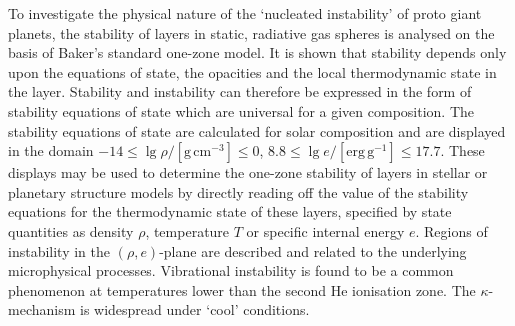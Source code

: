  
  \abstract
   {To investigate the physical nature of the `nuc\-leated instability' of
   proto giant planets, the stability of layers
   in static, radiative gas spheres is analysed on the basis of Baker's
   standard one-zone model.}
   {It is shown that stability
   depends only upon the equations of state, the opacities and the local
   thermodynamic state in the layer. Stability and instability can
   therefore be expressed in the form of stability equations of state
   which are universal for a given composition.}
   {The stability equations of state are
   calculated for solar composition and are displayed in the domain
   $-14 \leq \lg \rho / \mathrm{[g\, cm^{-3}]} \leq 0 $,
   $ 8.8 \leq \lg e / \mathrm{[erg\, g^{-1}]} \leq 17.7$. These displays
   may be
   used to determine the one-zone stability of layers in stellar
   or planetary structure models by directly reading off the value of
   the stability equations for the thermodynamic state of these layers,
   specified
   by state quantities as density $\rho$, temperature $T$ or
   specific internal energy $e$.
   Regions of instability in the $(\rho,e)$-plane are described
   and related to the underlying microphysical processes.}
   {Vibrational instability is found to be a common phenomenon
   at temperatures lower than the second He ionisation
   zone. The $\kappa$-mechanism is widespread under `cool'
   conditions.}
   {}

